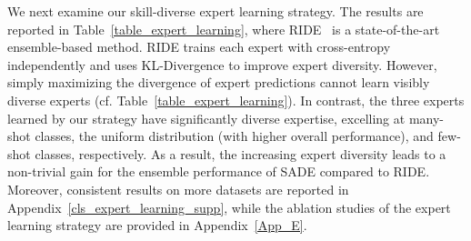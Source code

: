 \documentclass{article}
\begin{document}
We next examine   our  skill-diverse expert learning strategy. The results are  reported in Table~\ref{table_expert_learning}, where RIDE~\cite{wang2020long} is a state-of-the-art ensemble-based method.  RIDE trains each expert with cross-entropy independently  and uses  KL-Divergence     to improve expert  diversity. However, simply maximizing the divergence of expert predictions cannot learn visibly diverse experts (cf. Table~\ref{table_expert_learning}).  In contrast,
the three experts learned by our strategy have significantly diverse expertise, excelling at   many-shot classes,  the uniform  distribution (with higher overall  performance), and few-shot classes, respectively. As a result, the  increasing expert diversity leads to a non-trivial gain for the ensemble performance of  SADE compared to RIDE. 
Moreover,   consistent results on more datasets are reported  in Appendix~\ref{cls_expert_learning_supp}, while the ablation studies of the expert learning  strategy are provided in Appendix~\ref{App_E}.
\end{document}
